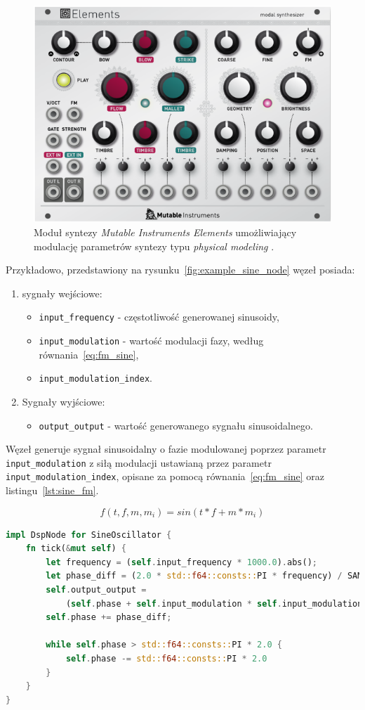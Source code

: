 \begin{figure}[H]
    \centering
    \includegraphics[width=0.45\linewidth]{rys02/mutable_instruments_elements.png}
    \caption{
      Moduł syntezy \textit{Mutable Instruments Elements} umożliwiający modulację
      parametrów syntezy typu \textit{physical modeling} \cite{lisp_synthesis}.
    }
    \label{fig:example_eurorack_module}
\end{figure}

\noindent
Przykładowo, przedstawiony na rysunku~\ref{fig:example_sine_node} węzeł posiada:
\begin{enumerate}
  \item sygnały wejściowe:
  \begin{itemize}
    \item \texttt{input\_frequency} - częstotliwość generowanej sinusoidy,
    \item \texttt{input\_modulation} - wartość modulacji fazy, według równania~\ref{eq:fm_sine},
    \item \texttt{input\_modulation\_index}.
  \end{itemize}
  \item Sygnały wyjściowe:
  \begin{itemize}
    \item \texttt{output\_output} - wartość generowanego sygnału sinusoidalnego.
  \end{itemize}
\end{enumerate}

\noindent
Węzeł generuje sygnał sinusoidalny o fazie modulowanej poprzez parametr \texttt{input\_modulation} z siłą modulacji ustawianą przez
parametr \texttt{input\_modulation\_index}, opisane za pomocą równania~\ref{eq:fm_sine} oraz listingu~\ref{lst:sine_fm}.

\begin{equation} \label{eq:fm_sine}
  f(t, f, m, m_i) = sin(t * f + m * m_i)
\end{equation}

\begin{lstlisting}[language=Rust, caption=Implementacja węzła SineOscillator.,label={lst:sine_fm}]
impl DspNode for SineOscillator {
    fn tick(&mut self) {
        let frequency = (self.input_frequency * 1000.0).abs();
        let phase_diff = (2.0 * std::f64::consts::PI * frequency) / SAMPLE_RATE;
        self.output_output =
            (self.phase + self.input_modulation * self.input_modulation_index * 10.0).sin();
        self.phase += phase_diff;

        while self.phase > std::f64::consts::PI * 2.0 {
            self.phase -= std::f64::consts::PI * 2.0
        }
    }
}
\end{lstlisting}

